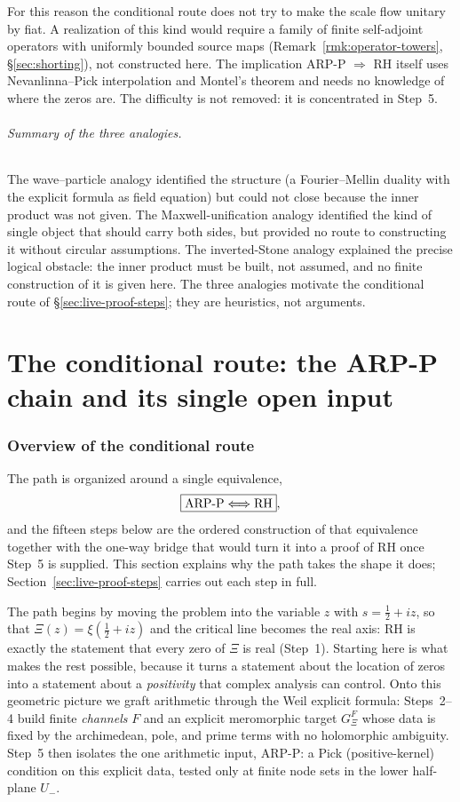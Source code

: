 \documentclass[11pt]{amsart}
\theoremstyle{definition}
\theoremstyle{remark}
\theoremstyle{definition}
\newcommand{\half}{\tfrac{1}{2}}
\newcommand{\GXi}{G_\Xi}
\begin{document}
For this reason the conditional route does not try to make the scale flow unitary by fiat. A
realization of this kind would require a family of finite self-adjoint operators with uniformly bounded
source maps (Remark~\ref{rmk:operator-towers}, \S\ref{sec:shorting}), not constructed here. The
implication ARP-P $\Rightarrow$ RH itself uses Nevanlinna--Pick interpolation and Montel's theorem and
needs no knowledge of where the zeros are. The difficulty is not removed: it is concentrated in Step~5.

\paragraph{Summary of the three analogies.} The wave--particle analogy identified the structure (a
Fourier--Mellin duality with the explicit formula as field equation) but could not close because the
inner product was not given. The Maxwell-unification analogy identified the kind of single object that
should carry both sides, but provided no route to constructing it without circular assumptions. The
inverted-Stone analogy explained the precise logical obstacle: the inner product must be built, not
assumed, and no finite construction of it is given here. The three analogies motivate the conditional
route of \S\ref{sec:live-proof-steps}; they are heuristics, not arguments.


\part{The conditional route: the ARP-P chain and its single open input}

\section{Overview of the conditional route}\label{sec:live-chain}

The path is organized around a single equivalence,
\[
   \boxed{\textnormal{ARP-P}\Longleftrightarrow\textnormal{RH}},
\]
and the fifteen steps below are the ordered construction of that equivalence together with the one-way
bridge that would turn it into a proof of RH once Step~5 is supplied.  This section explains why the path
takes the shape it does;
Section~\ref{sec:live-proof-steps} carries out each step in full.

The path begins by moving the problem into the variable $z$ with $s=\half+iz$, so that
$\Xi(z)=\xi(\half+iz)$ and the critical line becomes the real axis: RH is exactly the statement that
every zero of $\Xi$ is real (Step~1).  Starting here is what makes the rest possible, because it turns a
statement about the location of zeros into a statement about a \emph{positivity} that complex analysis
can control.  Onto this geometric picture we graft arithmetic through the Weil explicit formula:
Steps~2--4 build finite \emph{channels} $F$ and an explicit meromorphic target $\GXi^F$ whose data is
fixed by the archimedean, pole, and prime terms with no holomorphic ambiguity.  Step~5 then isolates
the one arithmetic input, ARP-P: a Pick (positive-kernel) condition on this explicit data, tested only
at finite node sets in the lower half-plane $U_-$.
\end{document}
